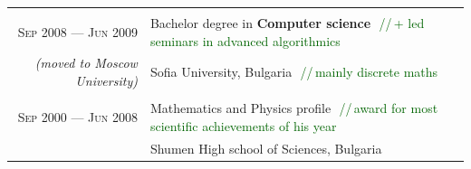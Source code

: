 \documentclass[a4paper,10pt]{article}
\def\myline{\color{linegray}\vline}
\newcommand{\minorcolor}[1]{\textcolor{mygray}{#1}}
\newcommand{\comment}[1]{\small\textcolor{darkgreen}{\,\,//\,#1}}
\newcommand{\mydate}[1]{\minorcolor{\textsc{#1}}}
\newcommand{\bracketcomment}[1]{{\small\textit{\minorcolor{(#1)}}}}
\begin{document}
{\begin{tabular}{r!{\myline}p{14cm}}

        \\
        \mydate{Sep 2008 --- Jun 2009}      &   Bachelor degree in \textbf{Computer science}
                                                \comment{+ led seminars in advanced algorithmics}\\
        \bracketcomment{moved to Moscow University} &  Sofia University, Bulgaria \comment{mainly discrete maths}\\

       \\
        \mydate{Sep 2000 --- Jun 2008}      &   Mathematics and Physics profile
                                                \comment{award for most scientific achievements of his year}\\
                                            &   Shumen High school of Sciences, Bulgaria\\
\end{tabular}
}  %
\par\smallskip
\end{document}
